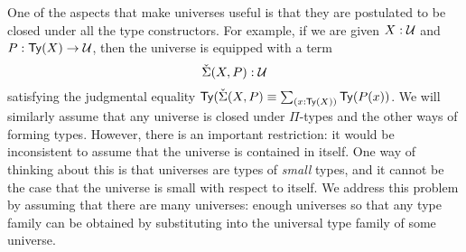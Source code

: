 One of the aspects that make universes useful is that they are postulated to be closed under all the type constructors. For example, if we are given $X:\mathcal{U}$ and $P:\mathsf{Ty}(X)\to \mathcal{U}$, then the universe is equipped with a term
\begin{equation*}
  \check{\Sigma}(X,P):\mathcal{U}
\end{equation*}
satisfying the judgmental equality $\mathsf{Ty}(\check{\Sigma}(X,P)\jdeq\sm{x:\mathsf{Ty}(X)}\mathsf{Ty}(P(x))$. We will similarly assume that any universe is closed under $\Pi$-types and the other ways of forming types. However, there is an important restriction: it would be inconsistent to assume that the universe is contained in itself. One way of thinking about this is that universes are types of \emph{small} types, and it cannot be the case that the universe is small with respect to itself. We address this problem by assuming that there are many universes: enough universes so that any type family can be obtained by substituting into the universal type family of some universe.

